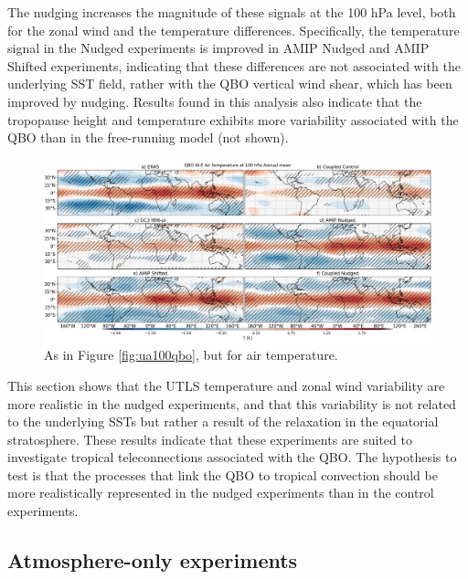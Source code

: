 The nudging increases the magnitude of these signals at the 100 hPa level, both for the zonal wind and the temperature differences. Specifically, the temperature signal in the Nudged experiments is improved in AMIP Nudged and AMIP Shifted experiments, indicating that these differences are not associated with the underlying SST field, rather with the QBO vertical wind shear, which has been improved by nudging. 
Results found in this analysis also indicate that the tropopause height and temperature exhibits more variability associated with the QBO than in the free-running model (not shown). 


\begin{figure}[t!]
\centering
 \includegraphics[width=\linewidth]{figures/ta100climqbowf.png}
\caption[Zonal wind QBO W-E difference 100 hPa level]{As in Figure \ref{fig:ua100qbo}, but for air temperature. }
\label{fig:ta100qbo}
\end{figure}

This section shows that the UTLS temperature and zonal wind variability are more realistic in the nudged experiments, and that this variability is not related to the underlying SSTs but rather a result of the relaxation in the equatorial stratosphere. These results indicate that these experiments are suited to investigate tropical teleconnections associated with the QBO. The hypothesis to test is that the processes that link the QBO to tropical convection should be more realistically represented in the nudged experiments than in the control experiments. %



\subsection{Atmosphere-only experiments}


